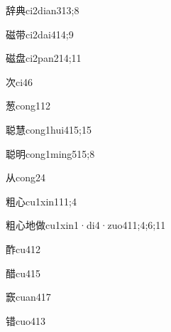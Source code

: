 \begin{verbete}{辞典}{ci2dian3}{13;8}
\end{verbete}

\begin{verbete}{磁带}{ci2dai4}{14;9}
\end{verbete}

\begin{verbete}{磁盘}{ci2pan2}{14;11}
\end{verbete}

\begin{verbete}{次}{ci4}{6}
\end{verbete}

\begin{verbete}{葱}{cong1}{12}
\end{verbete}

\begin{verbete}{聪慧}{cong1hui4}{15;15}
\end{verbete}

\begin{verbete}{聪明}{cong1ming5}{15;8}
\end{verbete}

\begin{verbete}{从}{cong2}{4}
\end{verbete}

\begin{verbete}{粗心}{cu1xin1}{11;4}
\end{verbete}

\begin{verbete}{粗心地做}{cu1xin1·di4·zuo4}{11;4;6;11}
\end{verbete}

\begin{verbete}{酢}{cu4}{12}
\end{verbete}

\begin{verbete}{醋}{cu4}{15}
\end{verbete}

\begin{verbete}{窾}{cuan4}{17}
\end{verbete}

\begin{verbete}{错}{cuo4}{13}
\end{verbete}


